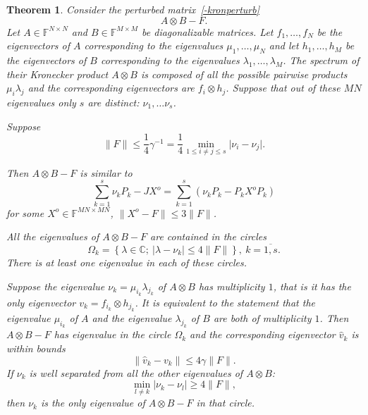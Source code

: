 \documentclass[14pt,a4paper]{extarticle}
\newtheorem{thm}{Theorem}
\theoremstyle{definition}
\begin{document}
\begin{thm}\label{nk:thm:kron}
    Consider the perturbed matrix~\eqref{-kronperturb}
        \[
            A{\otimes}B - F.
        \]
    Let \( A\in\mathbb{F}^{N{\times}N} \) and \( B\in\mathbb{F}^{M{\times}M} \)
        be diagonalizable matrices.
    Let \( f_1, \ldots, f_N \) be the eigenvectors of \( A \)
        corresponding to the eigenvalues \( \mu_1, \ldots, \mu_N \)
        and let \( h_1, \ldots, h_M \) be the eigenvectors of \( B \)
        corresponding to the eigenvalues \( \lambda_1, \ldots, \lambda_M \).
    The spectrum of their Kronecker product \( A{\otimes}B \)
        is composed of all the possible pairwise products \( \mu_i \lambda_j \)
        and the corresponding eigenvectors are \( f_i\otimes h_j \).
    Suppose that out of these \( MN \) eigenvalues only \( s \) are distinct:
        \( \nu_1, \ldots \nu_s \).

    Suppose
    \[
        \|F\| \leq \frac14 \gamma^{-1} = \frac14 \min_{1\leq i{\neq}j\leq s}\lvert\nu_i - \nu_j\rvert.
    \]

    Then \( A{\otimes}B - F \) is similar to
    \[ \sum_{k=1}^s \nu_k P_k - JX^o = \sum_{k=1}^s (\nu_k P_k - P_k X^o P_k) \]
    for some \( X^o \in \mathbb{F}^{MN{\times}MN} \),
    \( \|X^o - F\|\leq 3\|F\| \).

    All the eigenvalues of \( A{\otimes}B - F \) are contained in the circles
    \[
        \Omega_k = \left\{
            \lambda\in\mathbb{C};
            \ \lvert\lambda - \nu_k\rvert \leq 4\|F\|
            \right\},
        \ k{=}\overline{1,s}.
    \]
    There is at least one eigenvalue in each of these circles.

    Suppose the eigenvalue \( \nu_k=\mu_{i_k}\lambda_{j_k} \) of \( A{\otimes}B \) has multiplicity \( 1 \),
        that is it has the only eigenvector \( v_k = f_{i_k}{\otimes}h_{j_k} \).
    It is equivalent to the statement that the eigenvalue \( \mu_{i_k} \)
        of \( A \) and the eigenvalue \( \lambda_{j_k} \) of \( B \)
        are both of multiplicity \( 1 \).
    Then \( A{\otimes}B - F \) has eigenvalue in the circle \( \Omega_k \)
        and the corresponding eigenvector \( \hat{v}_k \) is within bounds
    \[
        \|\hat{v}_k - v_k\| \leq 4\gamma \|F\|.
    \]
    If \( \nu_k \) is well separated from all the other eigenvalues of \( A{\otimes}B \):
    \[
        \min_{l\neq k}
        \lvert
        \nu_k - \nu_l
        \rvert
        \geq 4\|F\|,
    \]
    then \( \nu_k \) is the only eigenvalue of \( A{\otimes}B - F \)
    in that circle.
\end{thm}
\end{document}
